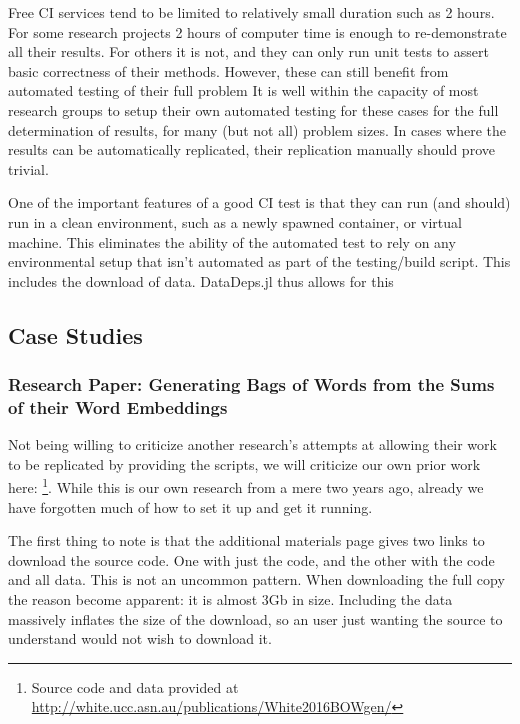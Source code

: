 \documentclass{jors}
\begin{document}
Free CI services tend to be limited to relatively small duration such as 2 hours.
For some research projects 2 hours of computer time is enough to re-demonstrate all their results.
For others it is not, and they can only run unit tests to assert basic correctness of their methods.
However, these can still benefit from automated testing of their full problem
It is well within the capacity of most research groups to setup their own automated testing for these cases for the full determination of results, for many (but not all) problem sizes.
In cases where the results can be automatically replicated, their replication manually should prove trivial.

One of the important features of a good CI test is that they can run (and should) run in a clean environment, such as a newly spawned container, or virtual machine.
This eliminates the ability of the automated test to rely on any environmental setup that isn't automated as part of the testing/build script.
This includes the download of data.
DataDeps.jl thus allows for this 










\subsection{Case Studies}\label{sec:case-studies}
\subsubsection{Research Paper: Generating Bags of Words from the Sums of their Word Embeddings}
Not being willing to criticize another research's attempts at allowing their work to be replicated by providing the scripts, we will criticize our own prior work here: \textcite{White2015BOWgen,White2015BOWgen} \footnote{Source code and data provided at \url{http://white.ucc.asn.au/publications/White2016BOWgen/}}.
While this is our own research from a mere two years ago, already we have forgotten much of how to set it up and get it running.

The first thing to note is that the additional materials page gives two links to download the source code.
One with just the code, and the other with the code and all data.
This is not an uncommon pattern.
When downloading the full copy the reason become apparent: it is almost 3Gb in size.
Including the data massively inflates the size of the download, so an user just wanting the source to understand would not wish to download it.
\end{document}
